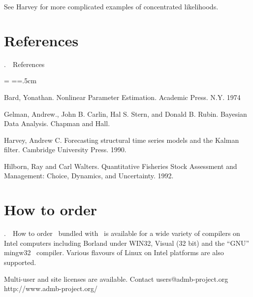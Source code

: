 \documentclass[12pt]{book}
\makeatletter
\def\mysection#1{\section{#1}{\bigbf \medbreak\noindent\number\c@chapter.\number\c@section\ \ #1\medbreak}}
\makeatother
\begin{document}
See Harvey for more complicated examples of concentrated likelihoods.
\mysection{References}
\htmlbeginignore
\medskip
{
\rmsmall\parindent=0cm \parskip=\medskipamount
\everypar={\hangindent=.5cm }
\htmlendignore

Bard, Yonathan. Nonlinear Parameter Estimation. 
Academic Press. N.Y. 1974

Gelman, Andrew., John B. Carlin, Hal S. Stern, and Donald B. Rubin.
Bayesian Data Analysis. Chapman and Hall. 

Harvey, Andrew C. Forecasting structural time series models and
the Kalman filter. Cambridge University Press. 1990.

Hilborn, Ray and Carl Walters. Quantitative Fisheries Stock
Assessment and Management: Choice, Dynamics, and Uncertainty.
1992.

\par
}

\mysection{How to order \ADM}
\ADM\ bundled with \AD\ is available for a wide variety of compilers on
Intel computers including Borland \cplus under WIN32, 
Visual \cplus (32 bit) and the ``GNU'' mingw32 \cplus\ compiler.  
Various flavours of Linux on Intel platforms are also supported.

Multi-user and site licenses
are available.
Contact 
\htmlbeginignore
\medskip
{\openup -4pt\obeylines
\htmlendignore
users@admb-project.org
http://www.admb-project.org/
\htmlbeginignore
}
\htmlendignore
\endchapter
%
\htmlnewfile
{
\pagestyle{xxx}

\def\hrefname#1#2{{
  \setbox0\hbox{#2 }
\myht=\ht0
\myhtt=\ht0
\mydp=\dp0
\mydpp=\dp0
\mywidth=\wd0
\advance \myht by 4pt
\advance \myhtt by 3pt
\advance \mydp by 4pt
\advance \mydpp by 3pt
\advance \mywidth by 2pt
\hbox{\vrule height\myht depth\mydp width 0pt
\pdfstartlink height \myhtt depth \mydpp attr {/C [0.9 0 0.0] /Border [0 0 1] } goto name {page.#1}
 \ #2

\pdfendlink}}}

\htmlnewfile
\twocolumn
{}


\onecolumn
\vfill
}
\end{document}

